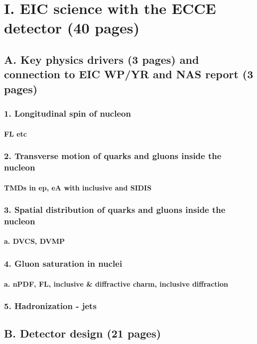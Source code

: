 \documentclass{report}
\begin{document}
\setcounter{tocdepth}{5}
\tableofcontents
%
\chapter{I. EIC science with the ECCE detector (40 pages)}
%
\section{A. Key physics drivers (3 pages) and connection to EIC WP/YR and NAS report (3 pages)}
\subsection{1. Longitudinal spin of nucleon}
\subsubsection{FL etc}
\subsection{2. Transverse motion of quarks and gluons inside the nucleon}
\subsubsection{TMDs in ep, eA with inclusive and SIDIS}
\subsection{3. Spatial distribution of quarks and gluons inside the nucleon}
\subsubsection{a. DVCS, DVMP}
\subsection{4. Gluon saturation in nuclei}
\subsubsection{a. nPDF, FL, inclusive \& diffractive charm, inclusive diffraction}
\subsection{5. Hadronization - jets}
%
\section{B. Detector design (21 pages)}
\end{document}
